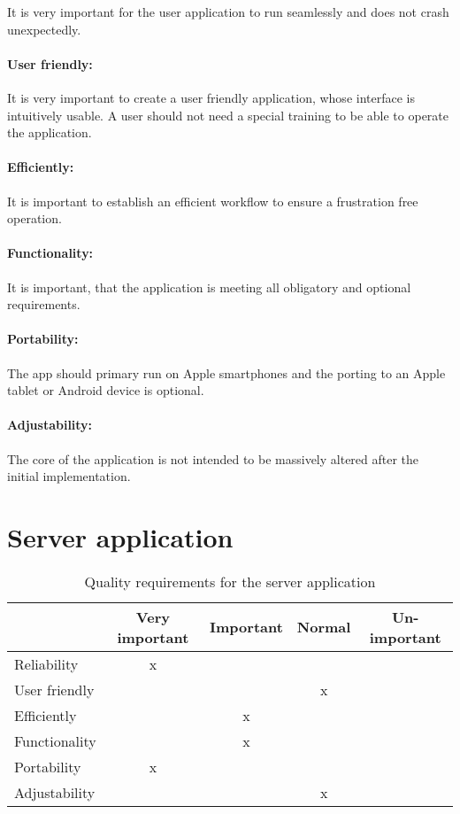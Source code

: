 It is very important for the user application to run seamlessly and does not crash unexpectedly.

\paragraph{User friendly:}

It is very important to create a user friendly application, whose interface is intuitively usable. A user should not need a special training to be able to operate the application.

\paragraph{Efficiently:}

It is important to establish an efficient workflow to ensure a frustration free operation. 

\paragraph{Functionality:}

It is important, that the application is meeting all obligatory and optional requirements.

\paragraph{Portability:}

The app should primary run on Apple smartphones and the porting to an Apple tablet or Android device is optional.

\paragraph{Adjustability:}

The core of the application is not intended to be massively altered after the initial implementation.  

\section{Server application}
\begin{table}[h]
  \begin{tabular}{| l || c | c | c | c |}
      \hline
      & Very important & Important & Normal & Un-important \\ \hline \hline
      Reliability & x & & & \\ \hline
      User friendly & & & x & \\ \hline
      Efficiently & & x & & \\ \hline
      Functionality & & x & & \\ \hline
      Portability & x & & & \\ \hline
      Adjustability & & & x & \\ \hline
  \end{tabular}
  \caption{Quality requirements for the server application}
\end{table}


